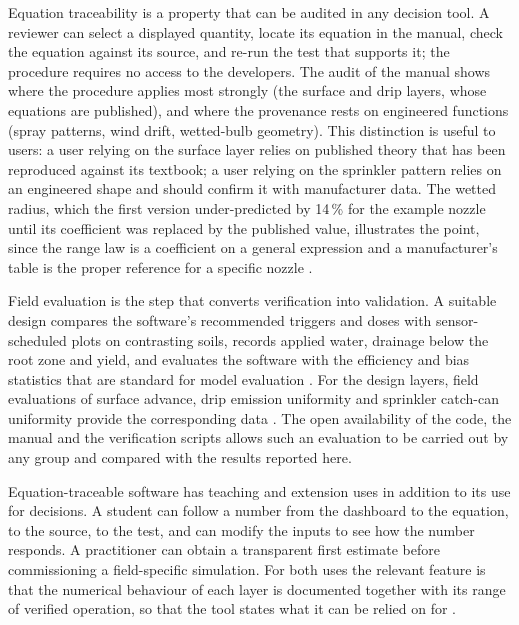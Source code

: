 \documentclass[preprint,12pt]{elsarticle}
\begin{document}
Equation traceability is a property that can be audited in any decision tool. A reviewer can select a displayed quantity, locate its equation in the manual, check the equation against its source, and re-run the test that supports it; the procedure requires no access to the developers. The audit of the manual shows where the procedure applies most strongly (the surface and drip layers, whose equations are published), and where the provenance rests on engineered functions (spray patterns, wind drift, wetted-bulb geometry). This distinction is useful to users: a user relying on the surface layer relies on published theory that has been reproduced against its textbook; a user relying on the sprinkler pattern relies on an engineered shape and should confirm it with manufacturer data. The wetted radius, which the first version under-predicted by 14\,\% for the example nozzle until its coefficient was replaced by the published value, illustrates the point, since the range law is a coefficient on a general expression and a manufacturer's table is the proper reference for a specific nozzle \cite{Keller1990,Playan2005}.


Field evaluation is the step that converts verification into validation. A suitable design compares the software's recommended triggers and doses with sensor-scheduled plots on contrasting soils, records applied water, drainage below the root zone and yield, and evaluates the software with the efficiency and bias statistics that are standard for model evaluation \cite{Moriasi2007,Nash1970,Bennett2013}. For the design layers, field evaluations of surface advance, drip emission uniformity and sprinkler catch-can uniformity provide the corresponding data \cite{Walker1987,Burt1997,Playan2005}. The open availability of the code, the manual and the verification scripts allows such an evaluation to be carried out by any group and compared with the results reported here.

Equation-traceable software has teaching and extension uses in addition to its use for decisions. A student can follow a number from the dashboard to the equation, to the source, to the test, and can modify the inputs to see how the number responds. A practitioner can obtain a transparent first estimate before commissioning a field-specific simulation. For both uses the relevant feature is that the numerical behaviour of each layer is documented together with its range of verified operation, so that the tool states what it can be relied on for \cite{Wilkinson2016,Hutton2016}.
\end{document}
